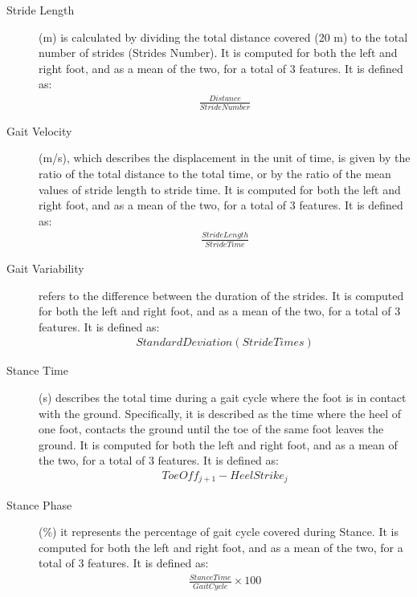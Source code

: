 \begin{description}
\item[Stride Length] 
 (m) is calculated by dividing the total distance covered (20 m) to the total number of strides (Strides Number). It is computed for both the left and right foot, and as a mean of the two, for a total of 3 features. It is defined as:
\begin{equation}
\begin{aligned}
\frac{Distance}{Stride Number}
\end{aligned}
\end{equation}

 
\item[Gait Velocity] 
 (m/s), which describes the displacement in the unit of time, is given by the ratio of the total distance to the total time, or by the ratio of the mean values of stride length to stride time. It is computed for both the left and right foot, and as a mean of the two, for a total of 3 features. It is defined as:
\begin{equation}
\begin{aligned}
\frac{Stride Length}{Stride Time}
\end{aligned}
\end{equation}


\item[Gait Variability] 
 refers to the difference between the duration of the strides. It is computed for both the left and right foot, and as a mean of the two, for a total of 3 features. It is defined as:
\begin{equation}
\begin{aligned}
Standard Deviation(Stride Times)
\end{aligned}
\end{equation}

 \item[Stance Time] 
 (s) describes the total time during a gait cycle where the foot is in contact with the ground. 
Specifically, it is described as the time where the heel of one foot, contacts the ground until the toe of the same foot 
leaves the ground. It is computed for both the left and right foot, and as a mean of the two, for a total of 3 features. It is defined as:
\begin{equation}
\begin{aligned}
Toe Off_{j+1}-Heel Strike_{j}
\end{aligned}
\end{equation}

\item[Stance Phase] (\%) it represents the percentage of gait cycle covered during Stance. It is computed for both the left and right foot, and as a mean of the two, for a total of 3 features. It is defined as:
\begin{equation}
\begin{aligned}
\frac{Stance Time}{Gait Cycle} \times 100
\end{aligned}
\end{equation}



\end{description}
